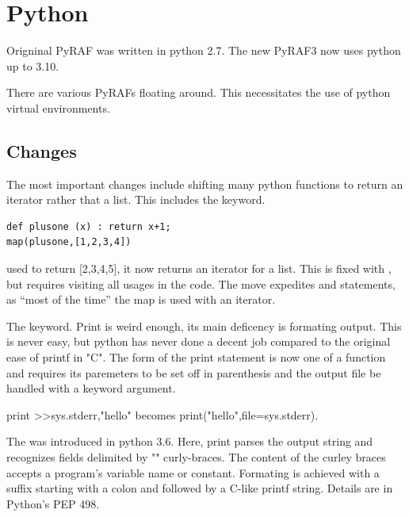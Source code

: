\renewcommand{\footerfilename}{Python.tex}

\section{Python}

Origninal PyRAF was written in python 2.7. The new PyRAF3 now uses python
up to 3.10.

There are various PyRAFs floating around. This necessitates the use of
python virtual environments. 

\subsection{Changes}

The most important changes include shifting many python functions to return
an iterator rather that a list. This includes the  keyword.

\begingroup \fontsize{10pt}{10pt}
\selectfont
\begin{verbatim} 
def plusone (x) : return x+1;
map(plusone,[1,2,3,4]) 
\end{verbatim}
\endgroup

used to return [2,3,4,5], it now returns an iterator for a list.  This
is fixed with , but requires
visiting all usages in the code.  The move expedites 
and  statements, as ``most of the time'' the map is used with
an iterator.


The  keyword. Print is weird enough, its main deficency is formating
output. This is never easy, but python has never done a decent job compared
to the original ease of printf in "C". The form of the print statement is now
one of a function and requires its paremeters to be set off in parenthesis and
the output file be handled with a keyword argument.

print >>sys.stderr,"hello" becomes print("hello",file=sys.stderr). 

The  was introduced in python 3.6. Here, print parses
the output string and recognizes fields delimited by "{}" curly-braces.
The content of the curley braces accepts a program's variable name or
constant. Formating is achieved with a suffix starting with a colon
and followed by a C-like printf string. Details are in Python's PEP 498.

